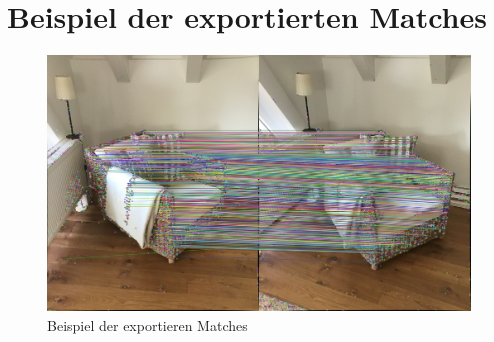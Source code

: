 \section{Beispiel der exportierten Matches}\label{appendix:opencv_filestorage_example}\begin{figure}
    \centering
    \includegraphics[width=\textwidth]{src/img/image 1 on 2 2071 935.jpg}
    \caption{Beispiel der exportieren Matches}
    \label{fig:example-match-output}
\end{figure}